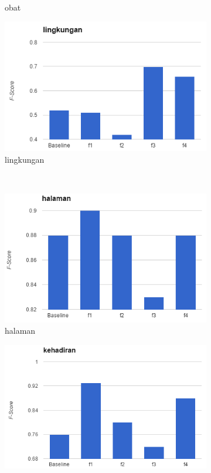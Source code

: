\begin{figure}[H]
\begin{subfigure}{.5\textwidth}
		\caption{obat}
	\end{subfigure}%
	\begin{subfigure}{.5\textwidth}
		\centering
		\includegraphics[width=1\linewidth]{adit_pics/lingkungan.png}
		\caption{lingkungan}
	\end{subfigure}%
	\\
	\begin{subfigure}{.5\textwidth}
		\centering
		\includegraphics[width=1\linewidth]{adit_pics/halaman.png}
		\caption{halaman}
	\end{subfigure}%
	\begin{subfigure}{.5\textwidth}
		\centering
		\includegraphics[width=1\linewidth]{adit_pics/kehadiran.png}

\end{subfigure}
\end{figure}
